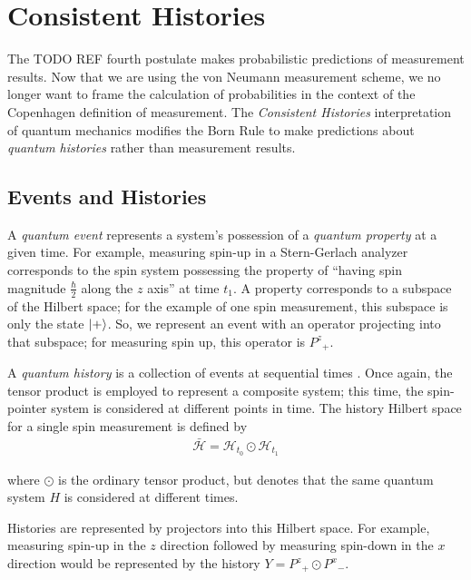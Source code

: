 \usetikzlibrary{shapes.geometric}
\usetikzlibrary{positioning}

\chapter{Consistent Histories}

The TODO REF fourth postulate makes probabilistic predictions of measurement results. Now that we are using the von Neumann measurement scheme, we no longer want to frame the calculation of probabilities in the context of the Copenhagen definition of measurement. The \textit{Consistent Histories} interpretation of quantum mechanics modifies the Born Rule to make predictions about \textit{quantum histories} rather than measurement results.

\section{Events and Histories}

A \textit{quantum event} represents a system's possession of a \textit{quantum property} at a given time. For example, measuring spin-up in a Stern-Gerlach analyzer corresponds to the spin system possessing the property of ``having spin magnitude $\frac{\hbar}{2}$ along the $z$ axis'' at time $t_1$. A property corresponds to a subspace of the Hilbert space; for the example of one spin measurement, this subspace is only the state $\ket{+}$. So, we represent an event with an operator projecting into that subspace; for measuring spin up, this operator is ${P^z}_+$.

A \textit{quantum history} is a collection of events at sequential times \cite{Griffiths}. Once again, the tensor product is employed to represent a composite system; this time, the spin-pointer system is considered at different points in time. The history Hilbert space for a single spin measurement is defined by
\begin{align}
  \bar{\mathcal{H}} = \mathcal{H}_{t_0} \odot \mathcal{H}_{t_1}
\end{align}

where $\odot$ is the ordinary tensor product, but denotes that the same quantum system $H$ is considered at different times.

Histories are represented by projectors into this Hilbert space. For example, measuring spin-up in the $z$ direction followed by measuring spin-down in the $x$ direction would be represented by the history $Y = {P^z}_+ \odot {P^x}_-$.

